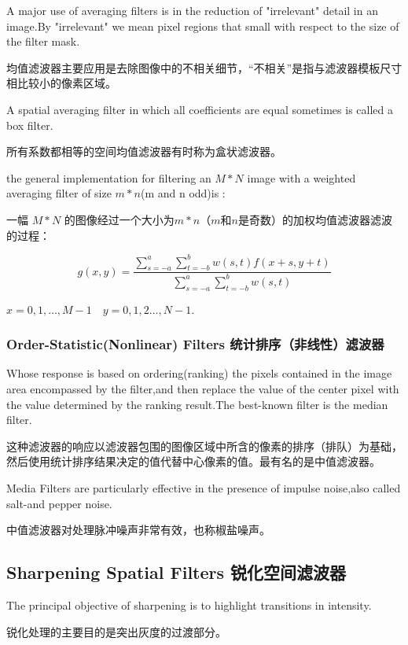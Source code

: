 \documentclass[a4paper,12pt]{article}
\numberwithin{equation}{section}%
\begin{document}
A major use of averaging filters is in the reduction of "irrelevant" detail in an image.By "irrelevant" we mean pixel regions that small with respect to the size of the filter mask.

均值滤波器主要应用是去除图像中的不相关细节，“不相关”是指与滤波器模板尺寸相比较小的像素区域。

A spatial averaging filter in which all coefficients are equal sometimes is called a box filter.

所有系数都相等的空间均值滤波器有时称为盒状滤波器。

the general implementation for filtering an $M*N$ image with a weighted averaging filter of size $m*n$(m and n odd)is :

一幅 $M*N$ 的图像经过一个大小为$m*n$（$m和n$是奇数）的加权均值滤波器滤波的过程：

\begin{equation} \label {3.28}   %
g(x,y)=\frac{\sum_{s=-a}^{a}\sum_{t=-b}^{b}w(s,t)f(x+s,y+t)}{\sum_{s=-a}^{a}\sum_{t=-b}^{b}w(s,t)}
\end{equation}

$x=0,1,\ldots ,M-1\quad y=0,1,2 \dots ,N-1$.

\subsubsection{Order-Statistic(Nonlinear) Filters 统计排序（非线性）滤波器}

Whose response is based on ordering(ranking) the pixels contained in the image area encompassed by the filter,and then replace the value of the center pixel with the value determined by the ranking result.The best-known filter is the median filter.

这种滤波器的响应以滤波器包围的图像区域中所含的像素的排序（排队）为基础，然后使用统计排序结果决定的值代替中心像素的值。最有名的是中值滤波器。

Media Filters are particularly effective in the presence of impulse noise,also called salt-and pepper noise.

中值滤波器对处理脉冲噪声非常有效，也称椒盐噪声。

\subsection{Sharpening Spatial Filters 锐化空间滤波器}

The principal objective of sharpening is to highlight transitions in intensity.

锐化处理的主要目的是突出灰度的过渡部分。
\end{document}
